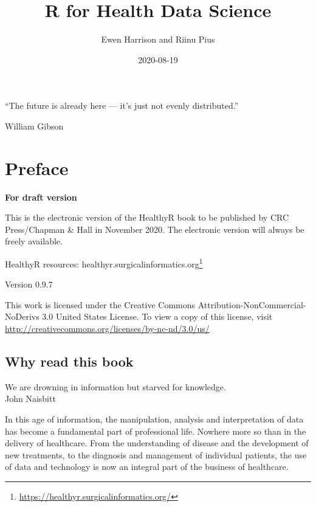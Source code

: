 \documentclass[
  12pt,
  krantz2]{krantz}
\title{R for Health Data Science}
\author{Ewen Harrison and Riinu Pius}
\date{2020-08-19}
\renewenvironment{quote}{\begin{VF}}{\end{VF}}
\renewcommand{\href}[2]{#2\footnote{\url{#1}}}
\begin{document}
\maketitle


\thispagestyle{empty}

\begin{center}
``The future is already here — it's just not evenly distributed.''

William Gibson
\end{center}

\setlength{\abovedisplayskip}{-5pt}
\setlength{\abovedisplayshortskip}{-5pt}

{
\hypersetup{linkcolor=}
\setcounter{tocdepth}{2}
\tableofcontents
}
\listoftables
\listoffigures
\hypertarget{preface}{%
\chapter*{Preface}\label{preface}}


\textbf{For draft version}

This is the electronic version of the HealthyR book to be published by CRC Press/Chapman \& Hall in November 2020.
The electronic version will always be freely available.

HealthyR resources: \href{https://healthyr.surgicalinformatics.org/}{healthyr.surgicalinformatics.org}

Version 0.9.7

This work is licensed under the Creative Commons Attribution-NonCommercial-NoDerivs 3.0 United States License. To view a copy of this license, visit \url{http://creativecommons.org/licenses/by-nc-nd/3.0/us/}

\hypertarget{why-read-this-book}{%
\section*{Why read this book}\label{why-read-this-book}}


\begin{quote}
We are drowning in information but starved for knowledge.\\
John Naisbitt
\end{quote}

In this age of information, the manipulation, analysis and interpretation of data has become a fundamental part of professional life.
Nowhere more so than in the delivery of healthcare.
From the understanding of disease and the development of new treatments, to the diagnosis and management of individual patients, the use of data and technology is now an integral part of the business of healthcare.
\end{document}
